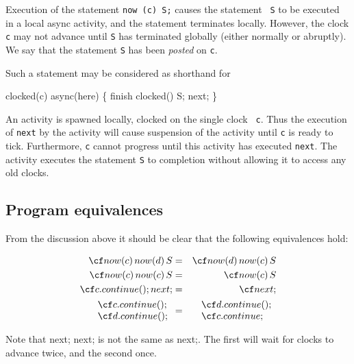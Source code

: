 Execution of the statement {\tt now (c) S;} causes the statement {\tt
S} to be executed in a local async activity, and the statement
terminates locally. However, the clock {\tt c} may not advance until
{\tt S} has terminated globally (either normally or abruptly). We say
that the statement {\tt S} has been {\em posted} on {\tt c}.

Such a statement may be considered as shorthand for
\begin{x10}
  clocked(c) async(here) \{ 
     finish clocked() S; 
     next;
  \}
\end{x10}
An activity is spawned locally, clocked on the single clock {\tt
c}. Thus the execution of {\tt next} by the activity will cause
suspension of the activity until {\tt c} is ready to
tick. Furthermore, {\tt c} cannot progress until this activity has
executed {\tt next}. The activity executes the statement {\tt S} to
completion without allowing it to access any old clocks.


\subsection{Program equivalences}

From the discussion above it should be clear that the following
equivalences hold:

\begin{eqnarray}
 {\cf now(c)\, now(d)\,S} &=& {\cf now(d)\, now(c)\,S}\\
 {\cf now(c)\, now(c)\,S} &=& {\cf now(c)\,S}\\
 {\cf c.continue();  next;} &=& {\cf next;}\\
\begin{array}{l}
 {\cf c.continue();}\\
 {\cf d.continue();}
\end{array}  &=& 
\begin{array}{l}
{\cf d.continue();}\\
{\cf c.continue;}
\end{array}
\end{eqnarray}

Note that {\cf next; next;} is not the same as {\cf next;}. The
first will wait for clocks to advance twice, and the second
once.  

